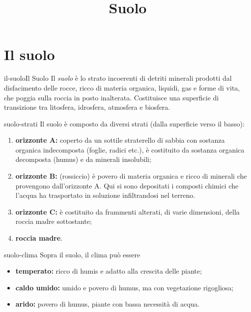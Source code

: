 \documentclass[preview]{standalone}
\begin{document}
\title{Suolo}
\genpage

\section{Il suolo}

\begin{snippetdefinition}{il-suolo}{Il Suolo}
    Il \textit{suolo} è lo strato incoerenti di detriti minerali prodotti dal disfacimento delle rocce,
    ricco di materia organica, liquidi, gas e forme di vita, che poggia sulla roccia
    in posto inalterata. Costituisce una superficie di transizione tra litosfera,
    idrosfera, atmosfera e biosfera.
\end{snippetdefinition}

\begin{snippet}{suolo-strati}
    Il suolo è composto da diversi strati (dalla superficie verso il basso):
    \begin{enumerate}
        \item \textbf{orizzonte A:} coperto da un sottile
            straterello di sabbia con sostanza organica indecomposta (foglie, radici etc.),
            è costituito da sostanza organica decomposta (humus) e da minerali insolubili;
        \item \textbf{orizzonte B:} (rossiccio) è povero di materia organica e ricco di minerali che provengono
            dall'orizzonte A. Qui si sono depositati i composti chimici che l'acqua ha trasportato in soluzione infiltrandosi nel terreno.
        \item \textbf{orizzonte C:} è costituito da frammenti alterati, di varie dimensioni, della roccia madre sottostante;
        \item \textbf{roccia madre}.
    \end{enumerate}
\end{snippet}

\begin{snippet}{suolo-clima}
    Sopra il suolo, il clima può essere
    \begin{itemize}
        \item \textbf{temperato:} ricco di humis e adatto alla crescita delle piante;
        \item \textbf{caldo umido:} umido e povero di humus, ma con vegetazione rigogliosa;
        \item \textbf{arido:} povero di humus, piante con bassa necessità di acqua.
    \end{itemize}
\end{snippet}
\end{document}
